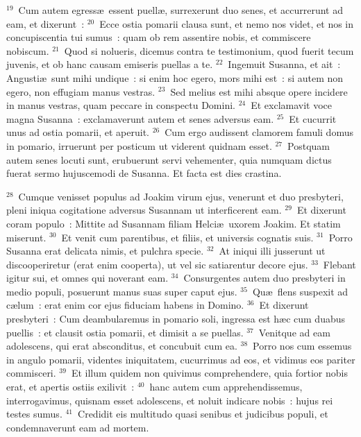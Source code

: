 ${}^{19}$~Cum autem egress\ae\ essent puell\ae , surrexerunt duo senes, et accurrerunt ad eam, et dixerunt~:
${}^{20}$~Ecce ostia pomarii clausa sunt, et nemo nos videt, et nos in concupiscentia tui sumus~: quam ob rem assentire nobis, et commiscere nobiscum.
${}^{21}$~Quod si nolueris, dicemus contra te testimonium, quod fuerit tecum juvenis, et ob hanc causam emiseris puellas a te.
${}^{22}$~Ingemuit Susanna, et ait~: Angusti\ae\ sunt mihi undique~: si enim hoc egero, mors mihi est~: si autem non egero, non effugiam manus vestras.
${}^{23}$~Sed melius est mihi absque opere incidere in manus vestras, quam peccare in conspectu Domini.
${}^{24}$~Et exclamavit voce magna Susanna~: exclamaverunt autem et senes adversus eam.
${}^{25}$~Et cucurrit unus ad ostia pomarii, et aperuit.
${}^{26}$~Cum ergo audissent clamorem famuli domus in pomario, irruerunt per posticum ut viderent quidnam esset.
${}^{27}$~Postquam autem senes locuti sunt, erubuerunt servi vehementer, quia numquam dictus fuerat sermo hujuscemodi de Susanna. Et facta est dies crastina.


${}^{28}$~Cumque venisset populus ad Joakim virum ejus, venerunt et duo presbyteri, pleni iniqua cogitatione adversus Susannam ut interficerent eam.
${}^{29}$~Et dixerunt coram populo~: Mittite ad Susannam filiam Helci\ae\ uxorem Joakim. Et statim miserunt.
${}^{30}$~Et venit cum parentibus, et filiis, et universis cognatis suis.
${}^{31}$~Porro Susanna erat delicata nimis, et pulchra specie.
${}^{32}$~At iniqui illi jusserunt ut discooperiretur (erat enim cooperta), ut vel sic satiarentur decore ejus.
${}^{33}$~Flebant igitur sui, et omnes qui noverant eam.
${}^{34}$~Consurgentes autem duo presbyteri in medio populi, posuerunt manus suas super caput ejus.
${}^{35}$~Qu\ae\ flens suspexit ad c\ae lum~: erat enim cor ejus fiduciam habens in Domino.
${}^{36}$~Et dixerunt presbyteri~: Cum deambularemus in pomario soli, ingressa est h\ae c cum duabus puellis~: et clausit ostia pomarii, et dimisit a se puellas.
${}^{37}$~Venitque ad eam adolescens, qui erat absconditus, et concubuit cum ea.
${}^{38}$~Porro nos cum essemus in angulo pomarii, videntes iniquitatem, cucurrimus ad eos, et vidimus eos pariter commisceri.
${}^{39}$~Et illum quidem non quivimus comprehendere, quia fortior nobis erat, et apertis ostiis exilivit~:
${}^{40}$~hanc autem cum apprehendissemus, interrogavimus, quisnam esset adolescens, et noluit indicare nobis~: hujus rei testes sumus.
${}^{41}$~Credidit eis multitudo quasi senibus et judicibus populi, et condemnaverunt eam ad mortem.


